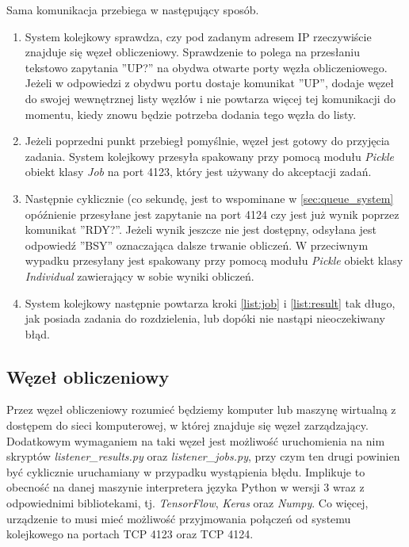 Sama komunikacja przebiega w następujący sposób.
\begin{enumerate}
  \item System kolejkowy sprawdza, czy pod zadanym adresem IP rzeczywiście znajduje się węzeł obliczeniowy.
  Sprawdzenie to polega na przesłaniu tekstowo zapytania ''UP?'' na obydwa otwarte porty węzła obliczeniowego.
  Jeżeli w odpowiedzi z obydwu portu dostaje komunikat ''UP'', dodaje węzeł do swojej wewnętrznej listy węzłów i nie powtarza więcej tej komunikacji do momentu, kiedy znowu będzie potrzeba dodania tego węzła do listy.
  \item Jeżeli poprzedni punkt przebiegł pomyślnie, węzeł jest gotowy do przyjęcia zadania.
  System kolejkowy przesyła spakowany przy pomocą modułu \textit{Pickle} obiekt klasy \textit{Job} na port 4123, który jest używany do akceptacji zadań.\label{list:job}
  \item Następnie cyklicznie (co sekundę, jest to wspominane w \ref{sec:queue_system} opóźnienie przesyłane jest zapytanie na port 4124 czy jest już wynik poprzez komunikat ''RDY?''.
  Jeżeli wynik jeszcze nie jest dostępny, odsyłana jest odpowiedź ''BSY'' oznaczająca dalsze trwanie obliczeń.\label{list:result}
  W przeciwnym wypadku przesyłany jest spakowany przy pomocą modułu \textit{Pickle} obiekt klasy \textit{Individual} zawierający w sobie wyniki obliczeń.
  \item System kolejkowy następnie powtarza kroki \ref{list:job} i \ref{list:result} tak długo, jak posiada zadania do rozdzielenia, lub dopóki nie nastąpi nieoczekiwany błąd.
\end{enumerate}

\subsection{Węzeł obliczeniowy}\label{sec:worker_node}

Przez węzeł obliczeniowy rozumieć będziemy komputer lub maszynę wirtualną z dostępem do sieci komputerowej, w której znajduje się węzeł zarządzający.
Dodatkowym wymaganiem na taki węzeł jest możliwość uruchomienia na nim skryptów \textit{listener\_results.py} oraz \textit{listener\_jobs.py}, przy czym ten drugi powinien być cyklicznie uruchamiany w przypadku wystąpienia błędu.
Implikuje to obecność na danej maszynie interpretera języka Python w wersji 3 wraz z odpowiednimi bibliotekami, tj. \textit{TensorFlow}\cite{tensorflow2015-whitepaper}, \textit{Keras}\cite{chollet2015keras} oraz \textit{Numpy}\cite{ascher.dubois.hinsen.hugunin.oliphant-1999-np}.
Co więcej, urządzenie to musi mieć możliwość przyjmowania połączeń od systemu kolejkowego na portach TCP 4123 oraz TCP 4124.

